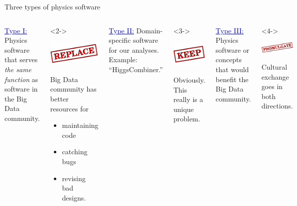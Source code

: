 \documentclass[aspectratio=169]{beamer}
\begin{document}
\begin{frame}{Three types of physics software}
\vspace{0.25 cm}
\begin{columns}[t]
\textcolor{darkblue}{\underline{Type I:}} Physics software that serves {\it the same function} as software in the Big Data community.

\begin{uncoverenv}<2->
\begin{center}
\includegraphics[height=1.5 cm]{stamp_replace.png}
\end{center}

Big Data community has better resources for
\begin{itemize}
\item maintaining code
\item catching bugs
\item revising bad designs.
\end{itemize}
\end{uncoverenv}

\textcolor{darkblue}{\underline{Type II:}} Domain-specific software for our analyses. Example: ``HiggsCombiner.'' \mbox{\hspace{1 cm}}

\begin{uncoverenv}<3->
\begin{center}
\includegraphics[height=1.5 cm]{stamp_keep.png}
\end{center}

Obviously. This really is a unique problem.
\end{uncoverenv}

\textcolor{darkblue}{\underline{Type III:}} Physics software or concepts that would benefit the Big Data community. \\ \mbox{ }

\begin{uncoverenv}<4->
\begin{center}
\includegraphics[height=1.5 cm]{stamp_promulgate.png}
\end{center}

Cultural exchange goes in both directions.
\end{uncoverenv}
\end{columns}
\end{frame}
\end{document}
